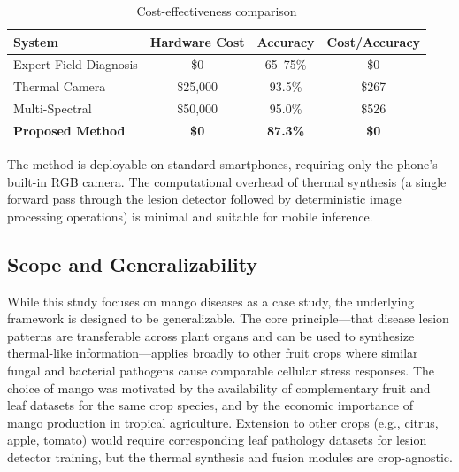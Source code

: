 \documentclass[utf8]{FrontiersinHarvard}
\newenvironment{revblock}{}{}
\begin{document}
\begin{table}[h!]
    \centering
    \caption{Cost-effectiveness comparison}
    \label{tab:cost}
    \footnotesize
    \begin{tabular}{lccc}
        \toprule
        \textbf{System} & \textbf{Hardware Cost} & \textbf{Accuracy} & \textbf{Cost/Accuracy} \\
        \midrule
        Expert Field Diagnosis & \$0 & 65--75\% & \$0 \\
        Thermal Camera & \$25,000 & 93.5\% & \$267 \\
        Multi-Spectral & \$50,000 & 95.0\% & \$526 \\
        \textbf{Proposed Method} & \textbf{\$0} & \textbf{87.3\%} & \textbf{\$0} \\
        \bottomrule
    \end{tabular}
\end{table}

\begin{revblock}
The method is deployable on standard smartphones, requiring only the phone's built-in RGB camera. The computational overhead of thermal synthesis (a single forward pass through the lesion detector followed by deterministic image processing operations) is minimal and suitable for mobile inference.
\end{revblock}

\begin{revblock}
\subsection{Scope and Generalizability}
While this study focuses on mango diseases as a case study, the underlying framework is designed to be generalizable. The core principle---that disease lesion patterns are transferable across plant organs and can be used to synthesize thermal-like information---applies broadly to other fruit crops where similar fungal and bacterial pathogens cause comparable cellular stress responses. The choice of mango was motivated by the availability of complementary fruit and leaf datasets for the same crop species, and by the economic importance of mango production in tropical agriculture. Extension to other crops (e.g., citrus, apple, tomato) would require corresponding leaf pathology datasets for lesion detector training, but the thermal synthesis and fusion modules are crop-agnostic.
\end{revblock}
\end{document}
